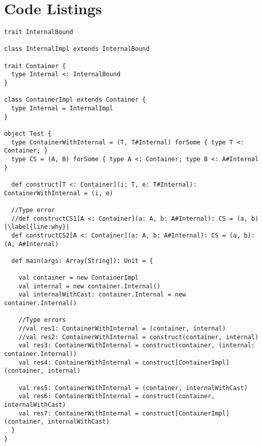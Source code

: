 \appendix
\chapter{Code Listings}
\begin{lstlisting}[caption=Existential inference, label=code:existentials, escapechar=|, float, floatplacement=H]
trait InternalBound

class InternalImpl extends InternalBound

trait Container {
  type Internal <: InternalBound
}

class ContainerImpl extends Container {
  type Internal = InternalImpl
}

object Test {
  type ContainerWithInternal = (T, T#Internal) forSome { type T <: Container; }
  type CS = (A, B) forSome { type A <: Container; type B <: A#Internal }

  def construct[T <: Container](i: T, e: T#Internal): ContainerWithInternal = (i, e)

  //Type error
  //def constructCS1[A <: Container](a: A, b: A#Internal): CS = (a, b) |\label{line:why}|
  def constructCS2[A <: Container](a: A, b: A#Internal): CS = (a, b): (A, A#Internal)

  def main(args: Array[String]): Unit = {

    val container = new ContainerImpl
    val internal = new container.Internal()
    val internalWithCast: container.Internal = new container.Internal()

    //Type errors
    //val res1: ContainerWithInternal = (container, internal)
    //val res2: ContainerWithInternal = construct(container, internal)
    val res3: ContainerWithInternal = construct(container, (internal: container.Internal))
    val res4: ContainerWithInternal = construct[ContainerImpl](container, internal)

    val res5: ContainerWithInternal = (container, internalWithCast)
    val res6: ContainerWithInternal = construct(container, internalWithCast)
    val res7: ContainerWithInternal = construct[ContainerImpl](container, internalWithCast)
  }
}
\end{lstlisting}
